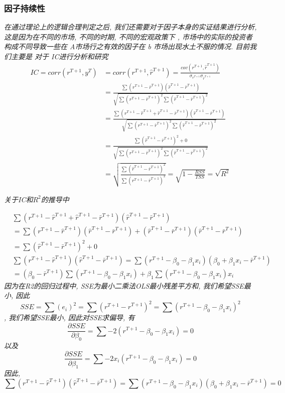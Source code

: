 \documentclass{scrartcl}
\numberwithin{equation}{section}   %
\begin{document}
\subsubsection{因子持续性}
\textsl{在通过理论上的逻辑合理判定之后, 我们还需要对于因子本身的实证结果进行分析, 这是因为在不同的市场, 不同的时期, 不同的宏观政策下 , 市场中的实际的投资者构成不同导致一些在 A市场行之有效的因子在 b 市场出现水土不服的情况. 目前我们主要是 对于 IC进行分析和研究}
\begin{equation}
    \begin{aligned}
        IC = corr(r^{T+1}, y^T) & = corr(r^{T+1}, \hat{r}^{T+1} ) = \frac{cov(r^{T+1}, \hat{r}^{T+1} )}{\sigma_{r^{T+1}} \sigma_{\hat{r}^{T+1}}} \\ &= \frac{\sum(r^{T+1} - \bar{r}^{T+1}) (\hat{r}^{T+1} - \bar{r}^{T+1})}{ \sqrt{\sum(r^{T+1} - \bar{r}^{T+1})^2 \sum(\hat{r}^{T+1} - \bar{r}^{T+1})^2}}\\ &=  \frac{\sum(r^{T+1} -\hat{r}^{T+1} + \hat{r}^{T+1} - \bar{r}^{T+1}) (\hat{r}^{T+1} - \bar{r}^{T+1})}{ \sqrt{\sum(r^{T+1} - \bar{r}^{T+1})^2 \sum(\hat{r}^{T+1}  - \bar{r}^{T+1})^2}} \\ &=  \frac{\sum( \hat{r}^{T+1} - \bar{r}^{T+1})^2 +0  }{ \sqrt{\sum(r^{T+1} - \bar{r}^{T+1})^2 \sum(\hat{r}^{T+1}  - \bar{r}^{T+1})^2}} \\ &= \sqrt{ \frac{\sum(\hat{r}^{T+1}  - \bar{r}^{T+1})^2}{\sum(r^{T+1} - \bar{r}^{T+1})^2 }}= \sqrt{ 1 - \frac{RSS}{TSS}} = \sqrt{R^2}
    \end{aligned}
\end{equation}

\textsl{
    关于IC和$R^2$的推导中}

\begin{equation}
    \begin{aligned}
         & \sum(r^{T+1} -\hat{r}^{T+1} + \hat{r}^{T+1} - \bar{r}^{T+1}) (\hat{r}^{T+1} - \bar{r}^{T+1})                                              \\ &=  \sum(r^{T+1} -\hat{r}^{T+1})(\hat{r}^{T+1} - \bar{r}^{T+1}) + (\hat{r}^{T+1} - \bar{r}^{T+1}) (\hat{r}^{T+1} - \bar{r}^{T+1})\\ &= \sum( \hat{r}^{T+1} - \bar{r}^{T+1})^2 +0\\
         & \sum(r^{T+1} -\hat{r}^{T+1})(\hat{r}^{T+1} - \bar{r}^{T+1}) =\sum(r^{T+1} - \beta_0 - \beta_1 x_i)(\beta_0 + \beta_1 x_i - \bar{r}^{T+1}) \\ &= (\beta_0 - \bar{r}^{T+1}) \sum(r^{T+1} - \beta_0 - \beta_1 x_i) + \beta_1 \sum(r^{T+1} - \beta_0 - \beta_1 x_i) x_i
    \end{aligned}
\end{equation}
\textsl{
    因为在R2的回归过程中, SSE为最小二乘法OLS最小残差平方和, 我们希望SSE最小, 因此$$SSE =\sum(e_i)^2 = \sum (r^{T+1} - \hat{r}^{T+1})^2 =\sum(r^{T+1} - \beta_0 - \beta_1 x_i)^2 $$, 我们希望SSE最小, 因此对SSE求偏导, 有$$ \frac{\partial SSE}{\partial \beta_0} =  \sum -2(r^{T+1}  -  \beta_0 - \beta_1 x_i ) = 0 $$ 以及 $$ \frac{\partial SSE}{\partial \beta_1} =  \sum -2 x_i(r^{T+1}  -  \beta_0 - \beta_1 x_i ) = 0 $$ 因此, $$\sum(r^{T+1} -\hat{r}^{T+1})(\hat{r}^{T+1} - \bar{r}^{T+1}) =\sum(r^{T+1} - \beta_0 - \beta_1 x_i)(\beta_0 + \beta_1 x_i - \bar{r}^{T+1}) =0$$
}
\end{document}
